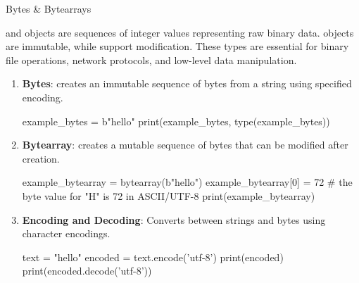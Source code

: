 \documentclass[10pt]{article}
\begin{document}
    \begin{core}[label=core:bytes]{Bytes \& Bytearrays}

       and  objects are sequences of integer values representing raw binary data.  objects are immutable, while  support modification. These types are essential for binary file operations, network protocols, and low-level data manipulation.

      \begin{enumerate}

        \item \textbf{Bytes}:  creates an immutable sequence of bytes from a string using specified encoding.

        \begin{pyconsole}

          example_bytes = b"hello"
          print(example_bytes, type(example_bytes))

        \end{pyconsole}

        \item \textbf{Bytearray}:  creates a mutable sequence of bytes that can be modified after creation.

        \begin{pyconsole}

          example_bytearray = bytearray(b"hello")
          example_bytearray[0] = 72 # the byte value for "H" is 72 in ASCII/UTF-8
          print(example_bytearray)

        \end{pyconsole}

        \item \textbf{Encoding and Decoding}: Converts between strings and bytes using character encodings.

        \begin{pyconsole}

          text = "hello"
          encoded = text.encode('utf-8')
          print(encoded)
          print(encoded.decode('utf-8'))

        \end{pyconsole}

      \end{enumerate}

    \end{core}
\end{document}
